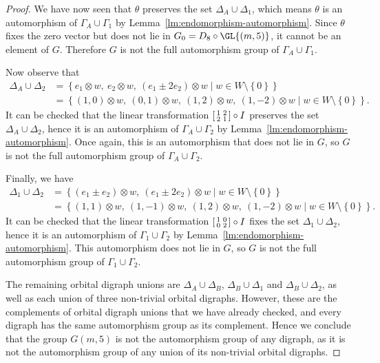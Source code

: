 \begin{proof}
We have now seen that $\theta$ preserves the set $\Delta_A \cup \Delta_1$, which means $\theta$ is an automorphism of $\Gamma_A \cup \Gamma_1$ by Lemma~\ref{lm:endomorphism-automorphism}. Since $\theta$ fixes the zero vector but does not lie in $G_0 = D_8 \circ \GL{\left(m, 5 \right)}$, it cannot be an element of $G$. Therefore $G$ is not the full automorphism group of $\Gamma_A \cup \Gamma_1$.

Now observe that
\begin{align*}
\Delta_A \cup \Delta_2 &= \left\{e_1 \otimes w,\ e_2 \otimes w,\ \left(e_1 \pm 2 e_2 \right) \otimes w \mid w \in W \setminus \left\{0 \right\}\right\} \\
&= {\left\{\left(1, 0 \right) \otimes w,\ \left(0, 1 \right) \otimes w,\ \left(1, 2 \right) \otimes w,\ \left(1, -2 \right) \otimes w \mid w \in W \setminus \left\{0 \right\}\right\}}.
\end{align*}
It can be checked that the linear transformation $\begin{bsmallmatrix} 1 & 2 \\ 2 & 1 \end{bsmallmatrix} \circ I$ preserves the set $\Delta_A \cup \Delta_2$, hence it is an automorphism of $\Gamma_A \cup \Gamma_2$ by Lemma~\ref{lm:endomorphism-automorphism}. Once again, this is an automorphism that does not lie in $G$, so $G$ is not the full automorphism group of $\Gamma_A \cup \Gamma_2$.

Finally, we have
\begin{align*}
\Delta_1 \cup \Delta_2 &= \left\{\left(e_1 \pm e_2 \right) \otimes w,\ \left(e_1 \pm 2 e_2 \right) \otimes w \mid w \in W \setminus \left\{0 \right\}\right\} \\
&= {\left\{\left(1, 1 \right) \otimes w,\ \left(1, -1 \right) \otimes w,\ \left(1, 2 \right) \otimes w,\ \left(1, -2 \right) \otimes w \mid w \in W \setminus \left\{0 \right\}\right\}}.
\end{align*}
It can be checked that the linear transformation $\begin{bsmallmatrix} 1 & 0 \\ 0 & 2 \end{bsmallmatrix} \circ I$ fixes the set $\Delta_1 \cup \Delta_2$, hence it is an automorphism of $\Gamma_1 \cup \Gamma_2$ by Lemma~\ref{lm:endomorphism-automorphism}. This automorphism does not lie in $G$, so $G$ is not the full automorphism group of $\Gamma_1 \cup \Gamma_2$.

The remaining orbital digraph unions are $\Delta_A \cup \Delta_B$, $\Delta_B \cup \Delta_1$ and $\Delta_B \cup \Delta_2$, as well as each union of three non-trivial orbital digraphs. However, these are the complements of orbital digraph unions that we have already checked, and every digraph has the same automorphism group as its complement. Hence we conclude that the group $G{\left(m, 5 \right)}$ is not the automorphism group of any digraph, as it is not the automorphism group of any union of its non-trivial orbital digraphs.
\end{proof}


